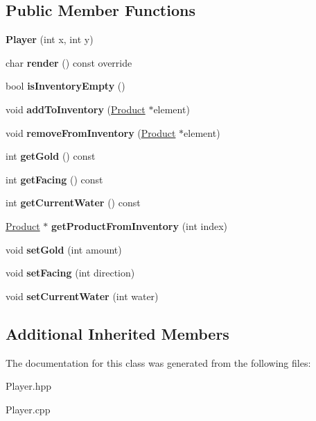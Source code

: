 \subsection*{Public Member Functions}
\begin{DoxyCompactItemize}
\item 
\mbox{\label{class_player_a9b009cc0bebdcc27a837d50b1f4ededd}} 
{\bfseries Player} (int x, int y)
\item 
\mbox{\label{class_player_a6daa4259fd7a2b382801f5e33e81960b}} 
char {\bfseries render} () const override
\item 
\mbox{\label{class_player_ab3c93d041cfa17ac2a10239979d9b1ca}} 
bool {\bfseries is\+Inventory\+Empty} ()
\item 
\mbox{\label{class_player_a4705a0783e10c3ca0e5d3c11e3d93f36}} 
void {\bfseries add\+To\+Inventory} (\mbox{\hyperlink{class_product}{Product}} $\ast$element)
\item 
\mbox{\label{class_player_a3244e8bdef443ebe88449b756df14bfe}} 
void {\bfseries remove\+From\+Inventory} (\mbox{\hyperlink{class_product}{Product}} $\ast$element)
\item 
\mbox{\label{class_player_af8eaab3b610debd175d424823e4af144}} 
int {\bfseries get\+Gold} () const
\item 
\mbox{\label{class_player_ac72a41034f2f445de714af0adf6f258b}} 
int {\bfseries get\+Facing} () const
\item 
\mbox{\label{class_player_a8cc8f60daa06748d93b403b93e887082}} 
int {\bfseries get\+Current\+Water} () const
\item 
\mbox{\label{class_player_a6d99956cb1a8e7a5827bdfc8ba5d775e}} 
\mbox{\hyperlink{class_product}{Product}} $\ast$ {\bfseries get\+Product\+From\+Inventory} (int index)
\item 
\mbox{\label{class_player_a3df9acb8705502fab750ffce3810136d}} 
void {\bfseries set\+Gold} (int amount)
\item 
\mbox{\label{class_player_aec7f48ef7cf6e10c2783a59b541ed709}} 
void {\bfseries set\+Facing} (int direction)
\item 
\mbox{\label{class_player_a3f2c01ca65976b3a3304dfcc4fcd8e87}} 
void {\bfseries set\+Current\+Water} (int water)
\end{DoxyCompactItemize}
\subsection*{Additional Inherited Members}


The documentation for this class was generated from the following files\+:\begin{DoxyCompactItemize}
\item 
Player.\+hpp\item 
Player.\+cpp\end{DoxyCompactItemize}
